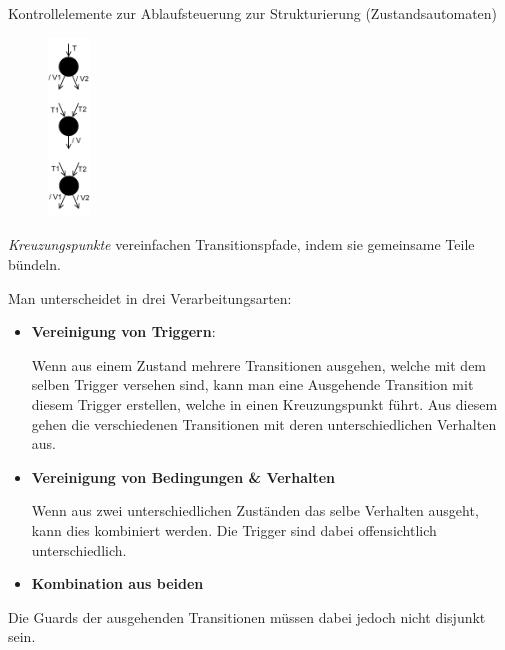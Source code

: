 \begin{defi}{Kontrollelemente zur Ablaufsteuerung zur Strukturierung (Zustandsautomaten)}
    \begin{figure}
        \centering
        \includegraphics[width=0.1\textwidth]{includes/figures/defi_diagrams_state_crosspoint.pdf}
    \end{figure}
    \emph{Kreuzungspunkte} vereinfachen Transitionspfade, indem sie gemeinsame Teile bündeln.

    Man unterscheidet in drei Verarbeitungsarten:
    \begin{itemize}
        \item \textbf{Vereinigung von Triggern}:

              Wenn aus einem Zustand mehrere Transitionen ausgehen, welche mit dem selben Trigger versehen sind, kann man eine Ausgehende Transition mit diesem Trigger erstellen, welche in einen Kreuzungspunkt führt.
              Aus diesem gehen die verschiedenen Transitionen mit deren unterschiedlichen Verhalten aus.
        \item \textbf{Vereinigung von Bedingungen \& Verhalten}

              Wenn aus zwei unterschiedlichen Zuständen das selbe Verhalten ausgeht, kann dies kombiniert werden.
              Die Trigger sind dabei offensichtlich unterschiedlich.
        \item \textbf{Kombination aus beiden}
    \end{itemize}

    Die Guards der ausgehenden Transitionen müssen dabei jedoch nicht disjunkt sein.
\end{defi}

